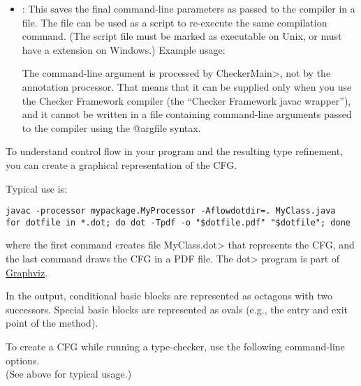 
\begin{itemize}

\item {}:
  This saves the final command-line parameters as passed to the compiler in a file.
  The file can be used as a script to re-execute the same compilation command.
  (The script file must be marked as executable on Unix, or
  must have a  extension on Windows.)
  Example usage: 

  The  command-line argument is processed by
  \<CheckerMain>, not by the annotation processor.  That means that it can be
  supplied only when you use the Checker Framework compiler (the ``Checker
  Framework javac wrapper''), and it cannot be written in a file containing
  command-line arguments passed to the compiler using the @argfile syntax.

\end{itemize}


To understand control flow in your program and the resulting type
refinement, you can create a graphical representation of the CFG.

Typical use is:

\begin{Verbatim}
javac -processor mypackage.MyProcessor -Aflowdotdir=. MyClass.java
for dotfile in *.dot; do dot -Tpdf -o "$dotfile.pdf" "$dotfile"; done
\end{Verbatim}

\noindent
where the first command creates file \<MyClass.dot> that
represents the CFG, and the last command draws the CFG in a PDF file.
The \<dot> program is part of \href{http://www.graphviz.org}{Graphviz}.

In the output, conditional basic blocks are represented as octagons with
two successors.  Special basic blocks are represented as ovals (e.g., the
entry and exit point of the method).



To create a CFG while running a type-checker, use the following
command-line options. \\
(See above for typical usage.)

